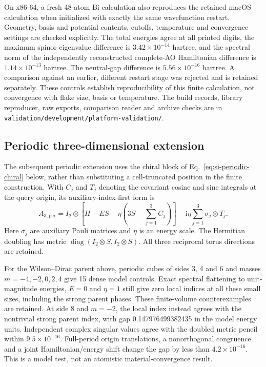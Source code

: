 \documentclass[11pt]{article}
\begin{document}
On x86-64, a fresh 48-atom Bi calculation also reproduces the
retained macOS calculation when initialized with exactly the same
wavefunction restart. Geometry, basis and potential contents,
cutoffs, temperature and convergence settings are checked explicitly.
The total energies agree at all printed digits, the maximum spinor
eigenvalue difference is $3.42\times10^{-14}$ hartree, and the
spectral norm of the independently reconstructed complete-AO
Hamiltonian difference is $1.14\times10^{-13}$ hartree.
The neutral-gap difference is $5.56\times10^{-16}$ hartree.
A comparison against an earlier, different restart stage was
rejected and is retained separately. These controls establish
reproducibility of this finite calculation, not convergence with
flake size, basis or temperature. The build records, library
reproducer, raw exports, comparison reader and archive checks are
in \nolinkurl{validation/development/platform-validation/}.

\subsection{Periodic three-dimensional extension}
The subsequent periodic extension uses the chiral block of
Eq.~\eqref{eq:si-periodic-chiral} below, rather than substituting
a cell-truncated position in the finite construction.
With $C_j$ and $T_j$ denoting the covariant cosine and sine
integrals at the query origin, its auxiliary-index-first form is
\begin{equation}
 A_{3,\mathrm{per}}=I_2\otimes
 \left[H-ES-\eta\left(3S-\sum_{j=1}^3C_j\right)\right]
 -\mathrm{i}\eta\sum_{j=1}^3\sigma_j\otimes T_j .
 \label{eq:si-periodic-chiral}
\end{equation}
Here $\sigma_j$ are auxiliary Pauli matrices and $\eta$ is an
energy scale. The Hermitian doubling has metric
$\operatorname{diag}(I_2\otimes S,I_2\otimes S)$.
All three reciprocal torus directions are retained.

For the Wilson--Dirac parent above, periodic cubes of sides
3, 4 and 6 and masses $m=-4,-2,0,2,4$ give 15 dense model
controls. Exact spectral flattening to unit-magnitude energies,
$E=0$ and $\eta=1$ still give zero local indices at all these
small sizes, including the strong parent phases. These
finite-volume counterexamples are retained.
At side 8 and $m=-2$, the local index instead agrees with the
nontrivial strong parent index, with gap 0.147976499382435
in the model energy units. Independent complex singular values
agree with the doubled metric pencil within $9.5\times10^{-16}$.
Full-period origin translations, a nonorthogonal congruence and
a joint Hamiltonian/energy shift change the gap by less than
$4.2\times10^{-16}$. This is a model test, not an atomistic
material-convergence result.
\end{document}

